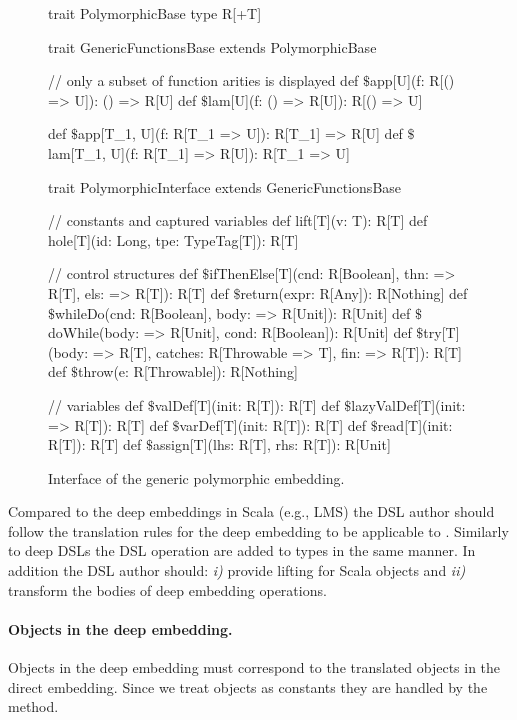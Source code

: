 \begin{figure}
\begin{listingtiny}
trait PolymorphicBase { type R[+T] }

trait GenericFunctionsBase extends PolymorphicBase {
  // only a subset of function arities is displayed
  def $\$$app[U](f: R[() => U]): () => R[U]
  def $\$$lam[U](f: () => R[U]): R[() => U]

  def $\$$app[T_1, U](f: R[T_1 => U]): R[T_1] => R[U]
  def $\$$lam[T_1, U](f: R[T_1] => R[U]): R[T_1 => U]
}

trait PolymorphicInterface extends GenericFunctionsBase {
  // constants and captured variables
  def lift[T](v: T): R[T]
  def hole[T](id: Long, tpe: TypeTag[T]): R[T]

  // control structures
  def $\$$ifThenElse[T](cnd: R[Boolean], thn: => R[T], els: => R[T]): R[T]
  def $\$$return(expr: R[Any]): R[Nothing]
  def $\$$whileDo(cnd: R[Boolean], body: => R[Unit]): R[Unit]
  def $\$$doWhile(body: => R[Unit], cond: R[Boolean]): R[Unit]
  def $\$$try[T](body: => R[T], catches: R[Throwable => T], fin: => R[T]): R[T]
  def $\$$throw(e: R[Throwable]): R[Nothing]

  // variables
  def $\$$valDef[T](init: R[T]): R[T]
  def $\$$lazyValDef[T](init: => R[T]): R[T]
  def $\$$varDef[T](init: R[T]): R[T]
  def $\$$read[T](init: R[T]): R[T]
  def $\$$assign[T](lhs: R[T], rhs: R[T]): R[Unit]
}
\end{listingtiny}
\caption{Interface of the generic polymorphic embedding.}
\label{fig:polymorphic-embedding}
\end{figure}

Compared to the deep embeddings in Scala (e.g., LMS) the DSL author should follow the
translation rules for the deep embedding to be applicable to \yy. Similarly to deep DSLs the
DSL operation are added to  types in the same manner. In addition the DSL author should:
\emph{i)} provide lifting for Scala objects and \emph{ii)} transform the bodies of deep embedding operations.

\paragraph{Objects in the deep embedding.} Objects in the deep embedding must correspond to the
translated objects in the direct embedding. Since we treat objects as constants
they are handled by the  method.

